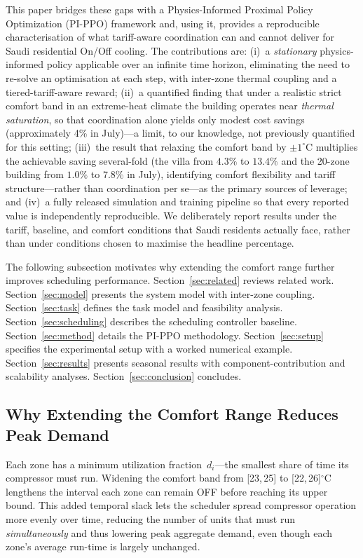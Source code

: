 \documentclass[12pt,a4paper]{article}
\begin{document}
This paper bridges these gaps with a Physics-Informed Proximal Policy Optimization (PI-PPO) framework and, using it, provides a reproducible characterisation of what tariff-aware coordination can and cannot deliver for Saudi residential On/Off cooling. The contributions are: (i)~a \textit{stationary} physics-informed policy applicable over an infinite time horizon, eliminating the need to re-solve an optimisation at each step, with inter-zone thermal coupling and a tiered-tariff-aware reward; (ii)~a quantified finding that under a realistic strict comfort band in an extreme-heat climate the building operates near \textit{thermal saturation}, so that coordination alone yields only modest cost savings (approximately 4\% in July)---a limit, to our knowledge, not previously quantified for this setting; (iii)~the result that relaxing the comfort band by $\pm1^\circ$C multiplies the achievable saving several-fold (the villa from $4.3\%$ to $13.4\%$ and the 20-zone building from $1.0\%$ to $7.8\%$ in July), identifying comfort flexibility and tariff structure---rather than coordination per se---as the primary sources of leverage; and (iv)~a fully released simulation and training pipeline so that every reported value is independently reproducible. We deliberately report results under the tariff, baseline, and comfort conditions that Saudi residents actually face, rather than under conditions chosen to maximise the headline percentage.

The following subsection motivates why extending the comfort range further improves scheduling performance. Section~\ref{sec:related} reviews related work. Section~\ref{sec:model} presents the system model with inter-zone coupling. Section~\ref{sec:task} defines the task model and feasibility analysis. Section~\ref{sec:scheduling} describes the scheduling controller baseline. Section~\ref{sec:method} details the PI-PPO methodology. Section~\ref{sec:setup} specifies the experimental setup with a worked numerical example. Section~\ref{sec:results} presents seasonal results with component-contribution and scalability analyses. Section~\ref{sec:conclusion} concludes.

\subsection{Why Extending the Comfort Range Reduces Peak Demand}

Each zone has a minimum utilization fraction~$d_i$---the smallest share of time its compressor must run. Widening the comfort band from [23,\,25] to [22,\,26]$^\circ$C lengthens the interval each zone can remain OFF before reaching its upper bound. This added temporal slack lets the scheduler spread compressor operation more evenly over time, reducing the number of units that must run \emph{simultaneously} and thus lowering peak aggregate demand, even though each zone's average run-time is largely unchanged.
\end{document}
